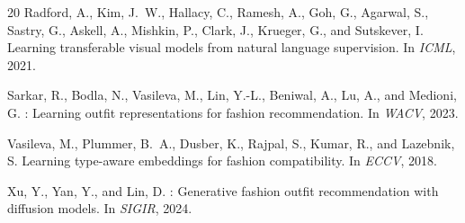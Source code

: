 \documentclass[10pt,twocolumn]{article}
\begin{document}
\begin{thebibliography}{20}
Radford, A., Kim, J.~W., Hallacy, C., Ramesh, A., Goh, G., Agarwal, S.,
Sastry, G., Askell, A., Mishkin, P., Clark, J., Krueger, G., and
Sutskever, I.
\newblock Learning transferable visual models from natural language
supervision.
\newblock In \emph{ICML}, 2021.

Sarkar, R., Bodla, N., Vasileva, M., Lin, Y.-L., Beniwal, A., Lu, A., and
Medioni, G.
: Learning outfit representations for fashion
recommendation.
\newblock In \emph{WACV}, 2023.

Vasileva, M., Plummer, B.~A., Dusber, K., Rajpal, S., Kumar, R., and
Lazebnik, S.
\newblock Learning type-aware embeddings for fashion compatibility.
\newblock In \emph{ECCV}, 2018.

Xu, Y., Yan, Y., and Lin, D.
: Generative fashion outfit recommendation with
diffusion models.
\newblock In \emph{SIGIR}, 2024.

\end{thebibliography}
\end{document}
